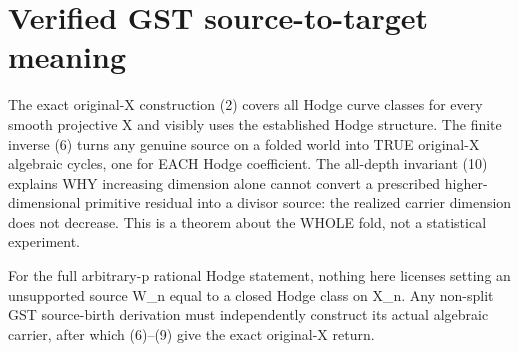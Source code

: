 \documentclass[11pt]{article}
\begin{document}
\section{Verified GST source-to-target meaning}
The exact original-X construction (2)
covers all Hodge curve classes for every
smooth projective X and visibly uses
the established Hodge structure.
The finite inverse (6) turns any
genuine source on a folded world
into TRUE original-X algebraic cycles,
one for EACH Hodge coefficient.
The all-depth invariant (10) explains
WHY increasing dimension alone cannot
convert a prescribed higher-dimensional
primitive residual into a divisor source:
the realized carrier dimension does not
decrease. This is a theorem about the
WHOLE fold, not a statistical experiment.

For the full arbitrary-p rational Hodge
statement, nothing here licenses setting
an unsupported source W_n equal to
a closed Hodge class on X_n. Any
non-split GST source-birth derivation
must independently construct its actual
algebraic carrier, after which (6)--(9)
give the exact original-X return.
\end{document}
